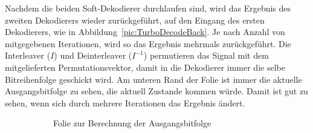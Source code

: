 Nachdem die beiden Soft-Dekodierer durchlaufen sind, wird das Ergebnis des zweiten Dekodierers wieder zurückgeführt, auf den Eingang des ersten Dekodierers, wie in Abbildung~\ref{pic:TurboDecodeBack}. Je nach Anzahl von mitgegebenen Iterationen, wird so das Ergebnis mehrmals zurückgeführt. Die Interleaver ($I$) und Deinterleaver ($I^{-1}$) permutieren das Signal mit dem mitgelieferten Permutationsvektor, damit in die Dekodierer immer die selbe Bitreihenfolge geschickt wird. Am unteren Rand der Folie ist immer die aktuelle Ausgangsbitfolge zu sehen, die aktuell Zustande kommen würde. Damit ist gut zu sehen, wenn sich durch mehrere Iterationen das Ergebnis ändert.

\begin{figure}[th]
\centering
	\begin{subfigure}{0.45\textwidth}
	\centering	
	\caption{Folie zur Berechnung der Ausgangsbitfolge}
	\label{pic:TurboDecodeResult}
	\end{subfigure}
	\qquad
	\begin{subfigure}{0.45\textwidth}
	\centering

\end{subfigure}
\end{figure}
